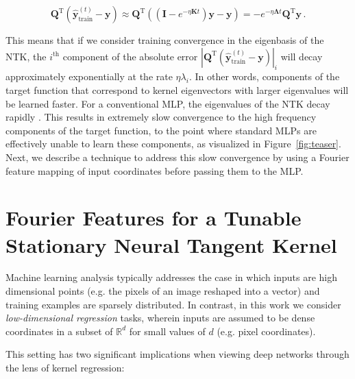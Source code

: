 \begin{equation}
    \mathbf{Q}^\mathrm{T} (\mathbf{\hat{y}}^{(t)}_\textrm{train} - \mathbf y) 
    \approx \mathbf{Q}^\mathrm{T} \left(\left( \mathbf{I} - e^{-\eta \mathbf{K} t} \right) \mathbf{y} - \mathbf{y} \right)  
    = -e^{-\eta \mathbf{\Lambda} t} \mathbf{Q}^\mathrm{T} \mathbf{y}\,.
\label{eqn:eig}
\end{equation}

This means that if we consider training convergence in the eigenbasis of the NTK, the $i^{\textrm{th}}$ component of the absolute error $ | \mathbf{Q}^\mathrm{T} (\mathbf{\hat{y}}^{(t)}_\textrm{train} - \mathbf y)  |_i$ will decay approximately exponentially at the rate $\eta \lambda_i$. In other words, components of the target function that correspond to kernel eigenvectors with larger eigenvalues will be learned faster. For a conventional MLP, the eigenvalues of the NTK decay rapidly \cite{basri2019convergence,bietti2019inductive, heckel2020compressive}. This results in extremely slow convergence to the high frequency components of the target function, to the point where standard MLPs are effectively unable to learn these components, as visualized in Figure~\ref{fig:teaser}. Next, we describe a technique to address this slow convergence by using a Fourier feature mapping of input coordinates before passing them to the MLP.

\section{Fourier Features for a Tunable Stationary Neural Tangent Kernel}
\label{sec:fourfeat}

Machine learning analysis typically addresses the case in which inputs are high dimensional points (e.g. the pixels of an image reshaped into a vector) and training examples are sparsely distributed. In contrast, in this work we consider \emph{low-dimensional regression} tasks, wherein inputs are assumed to be dense coordinates in a subset of $\mathbb R^d$ for small values of $d$ (e.g. pixel coordinates).

This setting has two significant implications when viewing deep networks through the lens of kernel regression:

